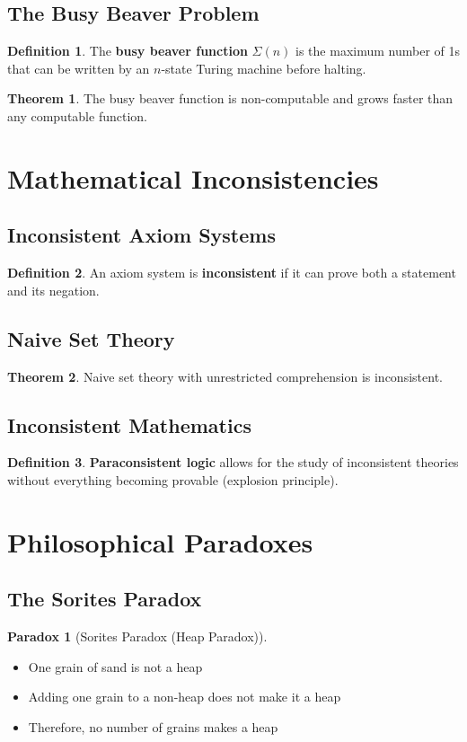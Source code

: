 \documentclass[11pt]{article}
\theoremstyle{definition}
\newtheorem{definition}{Definition}[section]
\newtheorem{theorem}{Theorem}[section]
\newtheorem{paradox}{Paradox}[section]
\begin{document}
\subsection{The Busy Beaver Problem}
\begin{definition}
The \textbf{busy beaver function} $\Sigma(n)$ is the maximum number of 1s that can be written by an $n$-state Turing machine before halting.
\end{definition}

\begin{theorem}
The busy beaver function is non-computable and grows faster than any computable function.
\end{theorem}

\section{Mathematical Inconsistencies}

\subsection{Inconsistent Axiom Systems}
\begin{definition}
An axiom system is \textbf{inconsistent} if it can prove both a statement and its negation.
\end{definition}

\subsection{Naive Set Theory}
\begin{theorem}
Naive set theory with unrestricted comprehension is inconsistent.
\end{theorem}

\subsection{Inconsistent Mathematics}
\begin{definition}
\textbf{Paraconsistent logic} allows for the study of inconsistent theories without everything becoming provable (explosion principle).
\end{definition}

\section{Philosophical Paradoxes}

\subsection{The Sorites Paradox}
\begin{paradox}[Sorites Paradox (Heap Paradox)]
\begin{itemize}
    \item One grain of sand is not a heap
    \item Adding one grain to a non-heap does not make it a heap
    \item Therefore, no number of grains makes a heap
\end{itemize}
\end{paradox}
\end{document}
